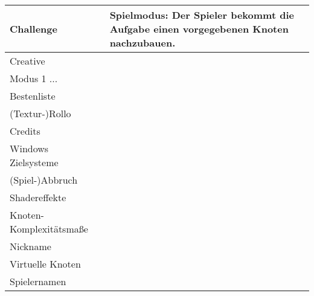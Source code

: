 \begin{tabular}{|p{}|p{}|}
\hline
Challenge & Spielmodus: Der Spieler bekommt die Aufgabe einen vorgegebenen
Knoten nachzubauen.\\
\hline
Creative & \\ Modus 1 ...\\
\hline
Bestenliste & \\
\hline
(Textur-)Rollo & \\
\hline
Credits & \\
\hline
Windows Zielsysteme & \\
\hline
(Spiel-)Abbruch & \\
\hline
Shadereffekte & \\
\hline
Knoten-Komplexitätsmaße & \\
\hline
Nickname & \\
\hline
Virtuelle Knoten & \\
\hline
Spielernamen & \\
\hline
\end{tabular}
